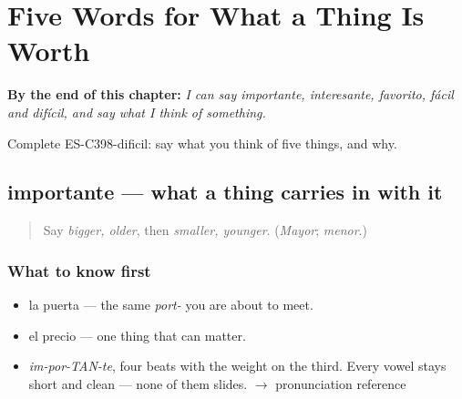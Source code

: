 
\chapter{Five Words for What a Thing Is Worth}
\label{ch:importante-y-facil}

\begin{chapteropening}
\textbf{By the end of this chapter:} \emph{I can say importante, interesante, favorito, fácil and difícil, and say what I think of something.}

Complete ES-C398-dificil: say what you think of five things, and why.
\end{chapteropening}

\section[importante]{importante — what a thing carries in with it}

\label{lesson:ES-C398-importante}



\begin{quote}
Say \emph{bigger, older}, then \emph{smaller, younger}. (\emph{Mayor}; \emph{menor}.)
\end{quote}

\subsection*{What to know first}
\begin{itemize}
\raggedright
  \item la puerta — the same \emph{port-} you are about to meet.
  \item el precio — one thing that can matter.
\end{itemize}

\begin{sounds}
\begin{itemize}
\raggedright
  \item \emph{im-por-TAN-te}, four beats with the weight on the third. Every vowel stays short and clean — none of them slides. $\to$ pronunciation reference
\end{itemize}
\end{sounds}


